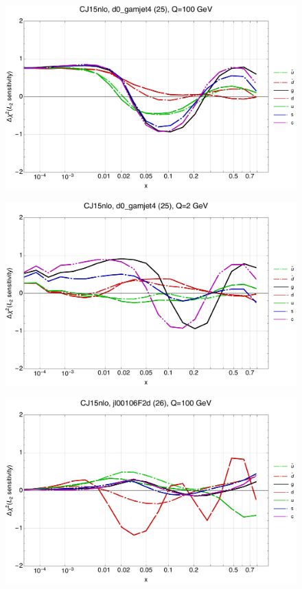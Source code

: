 \documentclass[10pt,aps,prd,floatfix,titlepage]{revtex4}
\begin{document}
\clearpage
\begin{figure}
\includegraphics[width=\textwidth,height=0.44\textheight,keepaspectratio]{1/25_CJ15nlo_L2_q100_Sf_1.pdf}
\caption{}
\end{figure}
\begin{figure}
\includegraphics[width=\textwidth,height=0.44\textheight,keepaspectratio]{1/25_CJ15nlo_L2_q2_Sf_1.pdf}
\caption{}
\end{figure}
\clearpage
\begin{figure}
\includegraphics[width=\textwidth,height=0.44\textheight,keepaspectratio]{1/26_CJ15nlo_L2_q100_Sf_1.pdf}
\caption{}
\end{figure}
\end{document}
